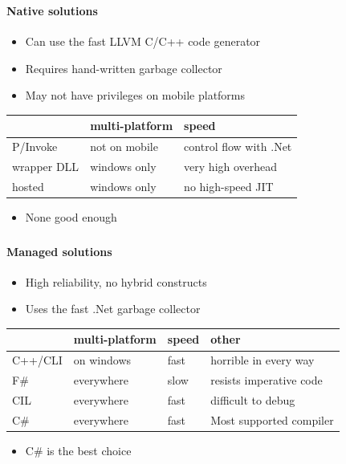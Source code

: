 \begin{frame}
    \frametitle{\subsecname}
    \framesubtitle{Native solutions}

    \begin{itemize}
        \item Can use the fast LLVM C/C++ code generator
        \item Requires hand-written garbage collector
        \item May not have privileges on mobile platforms
    \end{itemize}

    \begin{tabular}{l|l|l}
        & multi-platform & speed \\
        \hline
        P/Invoke      & not on mobile & control flow with .Net\\
        wrapper DLL   & windows only  & very high overhead \\
        hosted        & windows only  & no high-speed JIT \\
    \end{tabular}

    \begin{itemize}
        \item None good enough
    \end{itemize}
\end{frame}

\begin{frame}
    \frametitle{\subsecname}
    \framesubtitle{Managed solutions}

    \begin{itemize}
        \item High reliability, no hybrid constructs
        \item Uses the fast .Net garbage collector
    \end{itemize}

    \begin{tabular}{l|l|l|l}
        & multi-platform & speed & other\\
        \hline
        C++/CLI & on windows & fast & horrible in every way\\
        F\#     & everywhere & slow & resists imperative code\\
        CIL     & everywhere & fast & difficult to debug\\
        C\#     & everywhere & fast & Most supported compiler\\
    \end{tabular}

    \begin{itemize}
        \item C\# is the best choice
    \end{itemize}
\end{frame}

